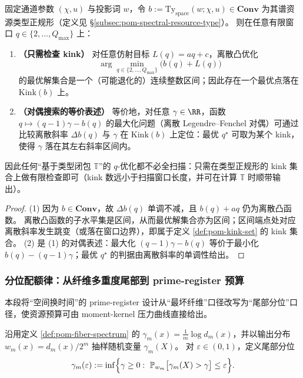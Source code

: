 \begin{proposition}\label{prop:pom-kink-principle-q-selection}
固定通道参数 \((\chi,u)\) 与投影词 \(w\)，令
\(
b:=\mathrm{Ty}_{\mathrm{space}}(w;\chi,u)\in\mathbf{Conv}
\)
为其谱资源类型正规形（定义见 \S\ref{subsec:pom-spectral-resource-type}）。
则在任意有限窗口 \(q\in\{2,\dots,Q_{\max}\}\) 上：
\begin{enumerate}
  \item \textbf{（只需检查 kink）} 对任意仿射目标 \(L(q)=aq+c\)，离散凸优化
  \[
  \arg\min_{q\in\{2,\dots,Q_{\max}\}}\bigl(b(q)+L(q)\bigr)
  \]
  的最优解集合是一个（可能退化的）连续整数区间；因此存在一个最优点落在 \(\mathrm{Kink}(b)\) 上。
  \item \textbf{（对偶搜索的等价表述）} 等价地，对任意 \(\gamma\in\RR\)，函数
  \(
  q\mapsto (q-1)\gamma-b(q)
  \)
  的最大化问题（离散 Legendre--Fenchel 对偶）可通过比较离散斜率 \(\Delta b(q)\) 与 \(\gamma\) 在 \(\mathrm{Kink}(b)\) 上定位：最优 \(q^\star\) 可取为某个 kink，使得 \(\gamma\) 落在其左右斜率区间内。
\end{enumerate}
因此任何“基于类型闭包 \(\mathbb{T}\)”的 \(q\)-优化都不必全扫描：只需在类型正规形的 kink 集合上做有限检查即可（kink 数远小于扫描窗口长度，并可在计算 \(\mathbb{T}\) 时顺带输出）。
\end{proposition}

\begin{proof}
(1) 因为 \(b\in\mathbf{Conv}\)，故 \(\Delta b(q)\) 单调不减，且 \(b(q)+aq\) 仍为离散凸函数。
离散凸函数的子水平集是区间，从而最优解集合亦为区间；区间端点处对应离散斜率发生跳变（或落在窗口边界），即属于定义 \ref{def:pom-kink-set} 的 kink 集合。
(2) 是 (1) 的对偶表述：最大化 \((q-1)\gamma-b(q)\) 等价于最小化 \(b(q)-(q-1)\gamma\)；最优 \(q^\star\) 的判据由离散斜率的单调性给出。
\end{proof}

\subsubsection{分位配额律：从纤维多重度尾部到 prime-register 预算}\label{subsec:pom-quantile-budget-law}

本段将“空间换时间”的 prime-register 设计从“最坏纤维”口径改写为“尾部分位”口径，使资源预算可由 moment-kernel 压力曲线直接给出。

\begin{definition}[纤维指数的尾部分位]\label{def:pom-gamma-quantile}
沿用定义 \ref{def:pom-fiber-spectrum} 的 \(\gamma_m(x)=\frac{1}{m}\log d_m(x)\)，并以输出分布 \(w_m(x)=d_m(x)/2^m\) 抽样随机变量 \(\gamma_m(X)\)。
对 \(\varepsilon\in(0,1)\)，定义尾部分位
$$
\gamma_{m}(\varepsilon):=\inf\Bigl\{\gamma\ge 0:\ \mathbb{P}_{w_m}\big[\gamma_m(X)>\gamma\big]\le \varepsilon\Bigr\}.
$$
\end{definition}

